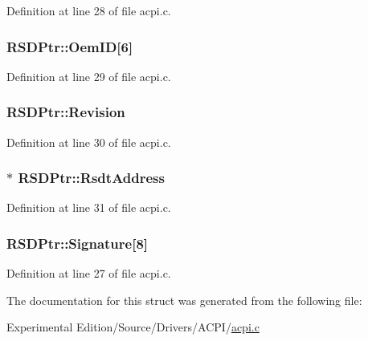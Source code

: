 Definition at line 28 of file acpi.\+c.

\subsubsection[{\texorpdfstring{Oem\+ID}{OemID}}]{ R\+S\+D\+Ptr\+::\+Oem\+ID\mbox{[}6\mbox{]}}\hypertarget{structRSDPtr_abdc8155e2acf415b30213793e4875306}{}\label{structRSDPtr_abdc8155e2acf415b30213793e4875306}


Definition at line 29 of file acpi.\+c.

\subsubsection[{\texorpdfstring{Revision}{Revision}}]{ R\+S\+D\+Ptr\+::\+Revision}\hypertarget{structRSDPtr_aa7a0f77fcedb849e6a3d5eb68a5df4cb}{}\label{structRSDPtr_aa7a0f77fcedb849e6a3d5eb68a5df4cb}


Definition at line 30 of file acpi.\+c.

\subsubsection[{\texorpdfstring{Rsdt\+Address}{RsdtAddress}}]{$\ast$ R\+S\+D\+Ptr\+::\+Rsdt\+Address}\hypertarget{structRSDPtr_a982825bea34910320148af4114ba8e00}{}\label{structRSDPtr_a982825bea34910320148af4114ba8e00}


Definition at line 31 of file acpi.\+c.

\subsubsection[{\texorpdfstring{Signature}{Signature}}]{ R\+S\+D\+Ptr\+::\+Signature\mbox{[}8\mbox{]}}\hypertarget{structRSDPtr_ae3efa3d06b7688110654bd24df504270}{}\label{structRSDPtr_ae3efa3d06b7688110654bd24df504270}


Definition at line 27 of file acpi.\+c.



The documentation for this struct was generated from the following file\+:\begin{DoxyCompactItemize}
\item 
Experimental Edition/\+Source/\+Drivers/\+A\+C\+P\+I/\hyperlink{acpi_8c}{acpi.\+c}\end{DoxyCompactItemize}
